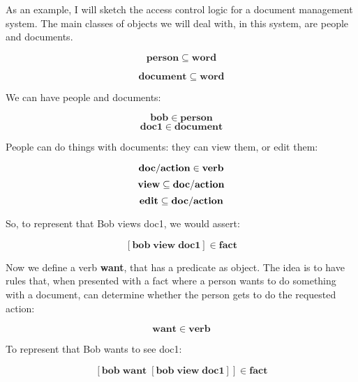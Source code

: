 \documentclass{IOS-Book-Article}     %
\begin{document}
As an example, I will sketch the access control logic for a
document management system. The main classes of objects we will deal with,
in this system, are people and documents.

\begin{equation}
  \mathbf{person \subseteq word}
\end{equation}

\begin{equation}
  \mathbf{document \subseteq word}
\end{equation}

We can have people and documents:

\begin{equation}
  \mathbf{bob \in person}
\end{equation}
\begin{equation}
  \mathbf{doc1 \in document}
\end{equation}

People can do things with documents: they can view them, or edit them:

\begin{equation}
  \mathbf{doc\-/action \in verb}
\end{equation}
\begin{equation}
  \mathbf{view \subseteq doc\-/action}
\end{equation}
\begin{equation}
  \mathbf{edit \subseteq doc\-/action}
\end{equation}

So, to represent that Bob views doc1, we would assert:

\begin{equation}
  \mathbf{\left[bob\; view\; doc1\right] \in fact}
\end{equation}

Now we define a verb \textbf{want}, that has a predicate as object.
The idea is to have rules that, when presented with a fact
where a person wants to do something with a document,
can determine whether the  person gets to do the requested action:

\begin{equation}
  \mathbf{want \in verb}
\end{equation}

To represent that Bob wants to see doc1:

\begin{equation}
  \mathbf{\left[bob\; want\; \left[bob\; view\; doc1\right]\right] \in fact}
\end{equation}
\end{document}
